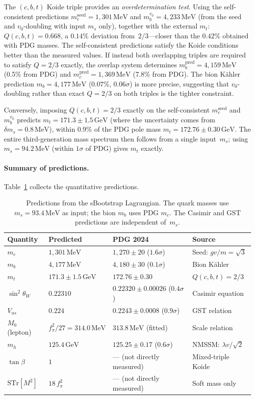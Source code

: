 \documentclass[12pt,a4paper]{article}
\newcommand{\MeV}{\,\text{MeV}}
\newcommand{\GeV}{\,\text{GeV}}
\newcommand{\fpi}{f_\pi}
\begin{document}
The $(c,b,t)$ Koide triple provides an \emph{overdetermination test}.
Using the self-consistent predictions
$m_c^{\text{seed}} = 1{,}301\MeV$ and
$m_b^{v_0} = 4{,}233\MeV$ (from the seed and $v_0$-doubling
with input $m_s$ only), together with the external $m_t$:
$Q(c,b,t) = 0.668$, a $0.14\%$ deviation from~$2/3$---closer
than the $0.42\%$ obtained with PDG masses.
The self-consistent predictions satisfy the Koide conditions
better than the measured values.
If instead both overlapping triples are required to
satisfy $Q = 2/3$ exactly, the overlap system determines
$m_b^{\text{pred}} = 4{,}159\MeV$ (0.5\% from PDG) and
$m_c^{\text{pred}} = 1{,}369\MeV$ (7.8\% from PDG). The bion
K\"ahler prediction $m_b = 4{,}177\MeV$ ($0.07\%$, $0.06\sigma$)
is more precise, suggesting that $v_0$-doubling rather than exact
$Q = 2/3$ on both triples is the tighter constraint.

Conversely, imposing $Q(c,b,t) = 2/3$ exactly on the self-consistent
$m_c^{\text{seed}}$ and $m_b^{v_0}$ predicts
$m_t = 171.3 \pm 1.5\GeV$ (where the uncertainty comes from
$\delta m_s = 0.8\MeV$), within $0.9\%$ of the PDG pole mass
$m_t = 172.76 \pm 0.30\GeV$.  The entire third-generation mass
spectrum then follows from a single input~$m_s$; using
$m_s = 94.2\MeV$ (within $1\sigma$ of PDG) gives $m_t$ exactly.

\paragraph{Summary of predictions.}
Table~\ref{tab:predictions} collects the quantitative predictions.
\begin{table}[ht]
\centering
\small
\begin{tabular}{llll}
\toprule
Quantity & Predicted & PDG 2024 & Source \\
\midrule
$m_c$ & $1{,}301\MeV$ & $1{,}270 \pm 20$ ($1.6\sigma$)
  & Seed: $gv/m = \sqrt{3}$ \\
$m_b$ & $4{,}177\MeV$ & $4{,}180 \pm 30$ ($0.1\sigma$)
  & Bion K\"ahler \\
$m_t$ & $171.3 \pm 1.5\GeV$ & $172.76 \pm 0.30$
  & $Q(c,b,t) = 2/3$ \\
$\sin^2\theta_W$ & $0.22310$ & $0.22320 \pm 0.00026$ ($0.4\sigma$)
  & Casimir equation \\
$V_{us}$ & $0.224$ & $0.2243 \pm 0.0008$ ($0.9\sigma$)
  & GST relation \\
$M_0$ (lepton) & $\fpi^2/27 = 314.0\MeV$ & $313.8\MeV$ (fitted)
  & Scale relation \\
$m_h$ & $125.4\GeV$ & $125.25 \pm 0.17$ ($0.6\sigma$)
  & NMSSM: $\lambda v/\sqrt{2}$ \\
$\tan\beta$ & $1$ & --- (not directly measured)
  & Mixed-triple Koide \\
$\text{STr}[M^2]$ & $18\,\fpi^2$ & --- (not directly measured)
  & Soft mass only \\
\bottomrule
\end{tabular}
\caption{Predictions from the sBootstrap Lagrangian.
The quark masses use $m_s = 93.4\MeV$ as input;
the bion $m_b$ uses PDG $m_c$.
The Casimir and GST predictions are independent
of~$m_s$.}
\label{tab:predictions}
\end{table}
\end{document}
